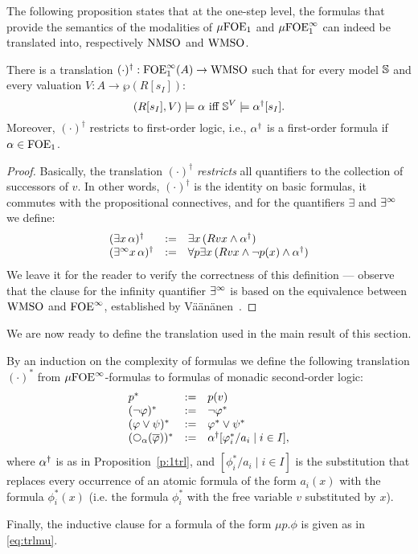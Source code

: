 The following proposition states that at the one-step level, the formulas that 
provide the semantics of the modalities of $\mu\mathrm{FOE}_1$ and $\mu\mathrm{FOE}^{\infty}_1$ can indeed 
be translated into, respectively $\mathrm{NMSO}$ and $\mathrm{WMSO}$.

\begin{proposition}
\label{p:1trl}
There is a translation $(\cdot)^{\dag}: \mathrm{FOE}^{\infty}_1(A) \to \mathrm{WMSO}$ such that for every 
model $\mathbb{S}$ and every valuation $V: A \to \wp(R[s_{I}])$:
\[
(R[s_{I}],V) \models \al \text{ iff } \model^{V} \models \al^{\dag}[s_{I}].
\]
Moreover, $(\cdot)^{\dag}$ restricts to first-order logic, i.e., $\alpha^{\dag}$ is
a first-order formula if $\alpha \in \mathrm{FOE}_1$.
\end{proposition}


\begin{proof}
Basically, the translation $(\cdot)^{\dag}$ \emph{restricts} all quantifiers
to the collection of successors of $v$.
In other words, $(\cdot)^{\dag}$ is the identity on basic formulas, it commutes
with the propositional connectives, and for the quantifiers $\exists$ and $\exists^\infty$
we define:
\[\begin{array}{lll}
(\exists x\, \alpha)^{\dag} &\mathrel{: =}& \exists x\, (Rvx \land \alpha^{\dag})
\\ (\exists^\infty x\, \alpha)^{\dag}  &\mathrel{: =}& \forall p \exists x\, (Rvx \land \neg p(x) 
    \land \alpha^{\dag})
\end{array}\]
We leave it for the reader to verify the correctness of this definition ---
observe that the clause for the infinity quantifier $\exists^\infty$ is based on the 
equivalence between $\mathrm{WMSO}$ and $\mathrm{FOE}^{\infty}$, established by 
V\"a\"an\"anen~\cite{vaananen77}.
\end{proof}

\noindent
We are now ready to define the translation used in the main result of this 
section.

\begin{definition}
By an induction on the complexity of formulas we define the following 
translation $(\cdot)^{*}$ from $\mu\mathrm{FOE}^{\infty}$-formulas to formulas of monadic 
second-order logic:
\[\begin{array}{lll}
   p^{*} &\df& p(v)
\\ (\neg\phi)^{*}        &\df& \neg \phi^{*}
\\ (\phi\lor\psi)^{*}    &\df& \phi^{*} \lor \psi^{*}
\\ (\nxt{\al}(\ol{\phi}))^{*} &\df& \al^{\dag}[\phi_{i}^{*}/a_{i} \mid i \in I],
\end{array}\]
where $\alpha^{\dag}$ is as in Proposition~\ref{p:1trl}, and $[\phi_{i}^{*}/a_{i}
\mid i \in I]$ is the substitution that replaces every occurrence of an atomic
formula of the form $a_{i}(x)$ with the formula $\phi_{i}^{*}(x)$ (i.e. the 
formula $\phi_{i}^{*}$ with the free variable $v$ substituted by $x$).

Finally, the inductive clause for a formula of the form $\mu p.\phi$ is given
as in \eqref{eq:trlmu}.
\end{definition}

